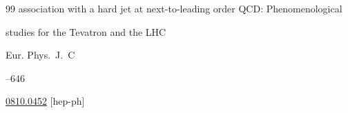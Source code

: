 \begin{thebibliography}{99}
association with a hard jet at next-to-leading order QCD: Phenomenological

studies for the Tevatron and the LHC

\jour Eur. Phys.~J.~C




--646

\arxiv \href{http://arxiv.org/abs/0810.0452}{0810.0452} [hep-ph]




\end{thebibliography}





\hskip6.5cm \thedate \par

\hskip6.5cm\therevdate\par





\newpage








\makeengtitlem





\renewcommand{\baselinestretch}{0.9}









%

